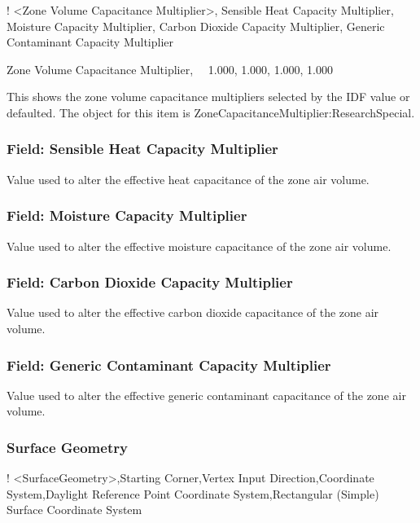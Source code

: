 ! \textless{}Zone Volume Capacitance Multiplier\textgreater{}, Sensible Heat Capacity Multiplier, Moisture Capacity Multiplier, Carbon Dioxide Capacity Multiplier, Generic Contaminant Capacity Multiplier

Zone Volume Capacitance Multiplier,~~ 1.000, 1.000, 1.000, 1.000

This shows the zone volume capacitance multipliers selected by the IDF value or defaulted. The object for this item is ZoneCapacitanceMultiplier:ResearchSpecial.

\subsubsection{Field: Sensible Heat Capacity Multiplier}\label{field-sensible-heat-capacity-multiplier}

Value used to alter the effective heat capacitance of the zone air volume.

\subsubsection{Field: Moisture Capacity Multiplier}\label{field-moisture-capacity-multiplier}

Value used to alter the effective moisture capacitance of the zone air volume.

\subsubsection{Field: Carbon Dioxide Capacity Multiplier}\label{field-carbon-dioxide-capacity-multiplier}

Value used to alter the effective carbon dioxide capacitance of the zone air volume.

\subsubsection{Field: Generic Contaminant Capacity Multiplier}\label{field-generic-contaminant-capacity-multiplier}

Value used to alter the effective generic contaminant capacitance of the zone air volume.

\subsubsection{Surface Geometry}\label{surface-geometry}

! \textless{}SurfaceGeometry\textgreater{},Starting Corner,Vertex Input Direction,Coordinate System,Daylight Reference Point Coordinate System,Rectangular (Simple) Surface Coordinate System

